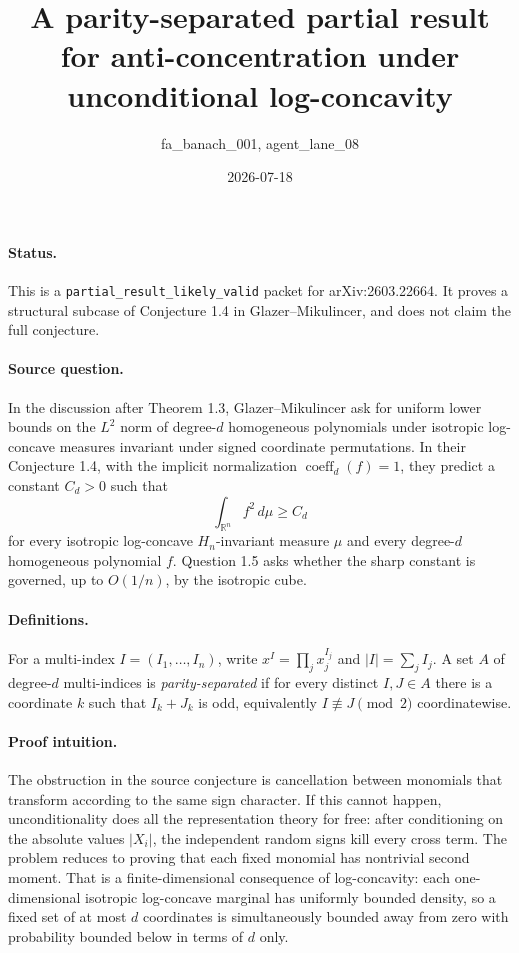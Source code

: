 \documentclass[11pt]{article}
\title{A parity-separated partial result for anti-concentration under unconditional log-concavity}
\author{fa\_banach\_001, agent\_lane\_08}
\date{2026-07-18}
\newcommand{\R}{\mathbb R}
\begin{document}
\maketitle

\paragraph{Status.}
This is a \texttt{partial\_result\_likely\_valid} packet for arXiv:2603.22664.
It proves a structural subcase of Conjecture 1.4 in Glazer--Mikulincer, and
does not claim the full conjecture.

\paragraph{Source question.}
In the discussion after Theorem 1.3, Glazer--Mikulincer ask for uniform lower
bounds on the $L^2$ norm of degree-$d$ homogeneous polynomials under isotropic
log-concave measures invariant under signed coordinate permutations.  In their
Conjecture 1.4, with the implicit normalization $\operatorname{coeff}_d(f)=1$,
they predict a constant $C_d>0$ such that
\[
  \int_{\R^n} f^2\,d\mu \geq C_d
\]
for every isotropic log-concave $H_n$-invariant measure $\mu$ and every
degree-$d$ homogeneous polynomial $f$.  Question 1.5 asks whether the sharp
constant is governed, up to $O(1/n)$, by the isotropic cube.

\paragraph{Definitions.}
For a multi-index $I=(I_1,\ldots,I_n)$, write $x^I=\prod_j x_j^{I_j}$ and
$|I|=\sum_j I_j$.  A set $A$ of degree-$d$ multi-indices is
\emph{parity-separated} if for every distinct $I,J\in A$ there is a coordinate
$k$ such that $I_k+J_k$ is odd, equivalently $I\not\equiv J \pmod 2$
coordinatewise.

\paragraph{Proof intuition.}
The obstruction in the source conjecture is cancellation between monomials
that transform according to the same sign character.  If this cannot happen,
unconditionality does all the representation theory for free: after conditioning
on the absolute values $|X_i|$, the independent random signs kill every cross
term.  The problem reduces to proving that each fixed monomial has nontrivial
second moment.  That is a finite-dimensional consequence of log-concavity:
each one-dimensional isotropic log-concave marginal has uniformly bounded
density, so a fixed set of at most $d$ coordinates is simultaneously bounded
away from zero with probability bounded below in terms of $d$ only.
\end{document}
